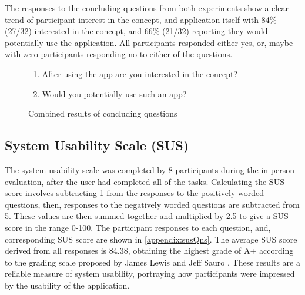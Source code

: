 The responses to the concluding questions from both experiments show a clear trend of participant interest in the concept, and application itself with 84\% (27/32) interested in the concept, and 66\% (21/32) reporting they would potentially use the application. All participants responded either yes, or, maybe with zero participants responding no to either of the questions.

\begin{figure}[H]

\begin{enumerate}
    \item After using the app are you interested in the concept?
    \item Would you potentially use such an app?
\end{enumerate}
\caption{Combined results of concluding questions}
\label{fig:conclAns}
\end{figure}
\FloatBarrier

\subsection{System Usability Scale (SUS)}
The system usability scale was completed by 8 participants during the in-person evaluation, after the user had completed all of the tasks. Calculating the SUS score involves subtracting 1 from the responses to the positively worded questions, then, responses to the negatively worded questions are subtracted from 5. These values are then summed together and multiplied by 2.5 to give a SUS score in the range 0-100. The participant responses to each question, and, corresponding SUS score are shown in \ref{appendix:susQns}. The average SUS score derived from all responses is 84.38, obtaining the highest grade of A+ according to the grading scale proposed by James Lewis and Jeff Sauro \cite{susGrades}. These results are a reliable measure of system usability, portraying how participants were impressed by the usability of the application.

